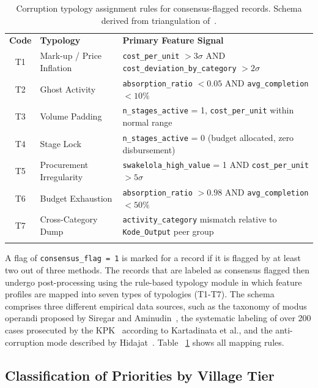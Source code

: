 \documentclass[3p,times,procedia]{elsarticle}
\begin{document}
\begin{table}[htb]
\caption{Corruption typology assignment rules for consensus-flagged records. Schema derived from triangulation of~\cite{ref12,ref13,ref14}.}
\label{tab:typo_rules}
\begin{tabular*}{\hsize}{@{\extracolsep{\fill}}cll@{}}
\toprule
\textbf{Code} & \textbf{Typology} & \textbf{Primary Feature Signal} \\
\colrule
T1 & Mark-up / Price Inflation   & \texttt{cost\_per\_unit} $> 3\sigma$ AND \texttt{cost\_deviation\_by\_category} $> 2\sigma$ \\
T2 & Ghost Activity              & \texttt{absorption\_ratio} $< 0.05$ AND \texttt{avg\_completion} $< 10\%$ \\
T3 & Volume Padding              & \texttt{n\_stages\_active} = 1, \texttt{cost\_per\_unit} within normal range \\
T4 & Stage Lock                  & \texttt{n\_stages\_active} = 0 (budget allocated, zero disbursement) \\
T5 & Procurement Irregularity    & \texttt{swakelola\_high\_value} = 1 AND \texttt{cost\_per\_unit} $> 5\sigma$ \\
T6 & Budget Exhaustion           & \texttt{absorption\_ratio} $> 0.98$ AND \texttt{avg\_completion} $< 50\%$ \\
T7 & Cross-Category Dump         & \texttt{activity\_category} mismatch relative to \texttt{Kode\_Output} peer group \\
\botrule
\end{tabular*}

\end{table}
A flag of \texttt{consensus\_flag = 1} is marked for a record if it is flagged by at least two out of three methods. The records that are labeled as consensus flagged then undergo post-processing using the rule-based typology module in which feature profiles are mapped into seven types of typologies (T1-T7). The schema comprises three different empirical data sources, such as the taxonomy of modus operandi proposed by Siregar and Aminudin~\cite{ref13}, the systematic labeling of over 200 cases prosecuted by the KPK~\cite{ref14} according to Kartadinata et al., and the anti-corruption mode described by Hidajat~\cite{ref12}. Table ~\ref{tab:typo_rules} shows all mapping rules.

\subsection{Classification of Priorities by Village Tier}
\end{document}
